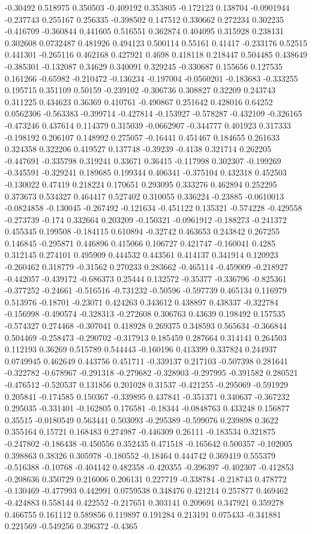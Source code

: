-0.30492 0.518975 0.350503 -0.409192 0.353805 -0.172123 0.138704 -0.0901944 -0.237743 0.255167 0.256335 -0.398502 0.147512 0.330662 0.272234 0.302235 -0.416709 -0.360844 0.441605 0.516551 0.362874 0.404095 0.315928 0.238131 0.302608 0.0732487 0.481926 0.494123 0.500114 0.55161 0.41417 -0.233176 0.52515 0.441301 -0.265116 0.462168 0.427921 0.4698 0.418118 0.218447 0.504485 0.438649 -0.385301 -0.132087 0.34629 0.340091 0.329245 -0.330687 0.155656 0.127535 0.161266 -0.65982 -0.210472 -0.136234 -0.197004 -0.0560201 -0.183683 -0.333255 0.195715 0.351109 0.50159 -0.239102 -0.306736 0.308827 0.32209 0.243743 0.311225 0.434623 0.36369 0.410761 -0.490867 0.251642 0.428016 0.64252 0.0562306 -0.563383 -0.399714 -0.427814 -0.153927 -0.578287 -0.432109 -0.326165 -0.473246 0.437614 0.114379 0.315039 -0.0662907 -0.344777 0.401923 0.317333 -0.198192 0.206107 0.148992 0.275057 -0.16441 0.451467 0.184655 0.261633 0.324358 0.322206 0.419527 0.137748 -0.39239 -0.4138 0.321714 0.262205 -0.447691 -0.335798 0.319241 0.33671 0.36415 -0.117998 0.302307 -0.199269 -0.345591 -0.329241 0.189685 0.199344 0.406341 -0.375104 0.432318 0.452503 -0.130022 0.47419 0.218224 0.170651 0.293095 0.333276 0.462894 0.252295 0.373673 0.534327 0.464417 0.527402 0.310055 0.336224 -0.23885 -0.0610013 -0.0824858 -0.130045 -0.267492 -0.121634 -0.451122 0.135321 -0.574228 -0.429558 -0.273739 -0.174 0.332664 0.203209 -0.150321 -0.0961912 -0.188273 -0.241372 0.455345 0.199508 -0.184115 0.610894 -0.32742 0.463653 0.243842 0.267255 0.146845 -0.295871 0.446896 0.415066 0.106727 0.421747 -0.160041 0.4285 0.312145 0.274101 0.495909 0.444532 0.443561 0.414137 0.341914 0.120923 -0.260462 0.318779 -0.31562 0.270233 0.283662 -0.465114 -0.459009 -0.218927 -0.442057 -0.439172 -0.686373 0.25444 0.132572 -0.35377 -0.336796 -0.825361 -0.377252 -0.24661 -0.516516 -0.731232 -0.50596 -0.597739 0.465134 0.116979 0.513976 -0.18701 -0.23071 0.424263 0.343612 0.438897 0.438337 -0.322784 -0.156998 -0.490574 -0.328313 -0.272608 0.306763 0.43639 0.198492 0.157535 -0.574327 0.274468 -0.307041 0.418928 0.269375 0.348593 0.565634 -0.366844 0.504469 -0.258473 -0.290702 -0.317913 0.185459 0.287664 0.314141 0.264503 0.112193 0.36269 0.515789 0.544443 -0.160196 0.413399 0.337824 0.244937 0.0749945 0.462649 0.443756 0.451711 -0.339137 0.217103 -0.507398 0.281641 -0.322782 -0.678967 -0.291318 -0.279682 -0.328903 -0.297995 -0.391582 0.280521 -0.476512 -0.520537 0.131856 0.201028 0.31537 -0.421255 -0.295069 -0.591929 0.205841 -0.174585 0.150367 -0.339895 0.437841 -0.351371 0.340637 -0.367232 0.295035 -0.331401 -0.162805 0.176581 -0.18344 -0.0848763 0.433248 0.156877 0.35515 -0.0180549 0.563441 0.503093 -0.295389 -0.599076 0.239898 0.3622 0.355164 0.15721 0.168483 0.274987 -0.446309 0.26111 -0.183534 0.321875 -0.247802 -0.186438 -0.450556 0.352435 0.471518 -0.165642 0.500357 -0.102005 0.398863 0.38326 0.305978 -0.180552 -0.18464 0.444742 0.369419 0.555379 -0.516388 -0.10768 -0.404142 0.482358 -0.420355 -0.396397 -0.402307 -0.412853 -0.208636 0.350729 0.216006 0.206131 0.227719 -0.338784 -0.218743 0.478772 -0.130469 -0.477993 0.442991 0.0759538 0.348476 0.421214 0.257877 0.469462 -0.424883 0.558144 0.422552 -0.217651 0.303141 0.209691 0.347921 0.359278 0.466755 0.161112 0.589856 0.119897 0.191284 0.213191 0.075433 -0.341881 0.221569 -0.549256 0.396372 -0.4365 